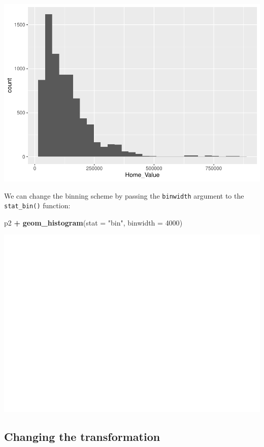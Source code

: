 \documentclass[
]{book}
\newenvironment{Shaded}{\begin{snugshade}}{\end{snugshade}}
\newcommand{\DataTypeTok}[1]{\textcolor[rgb]{0.13,0.29,0.53}{#1}}
\newcommand{\DecValTok}[1]{\textcolor[rgb]{0.00,0.00,0.81}{#1}}
\newcommand{\KeywordTok}[1]{\textcolor[rgb]{0.13,0.29,0.53}{\textbf{#1}}}
\newcommand{\NormalTok}[1]{#1}
\newcommand{\OperatorTok}[1]{\textcolor[rgb]{0.81,0.36,0.00}{\textbf{#1}}}
\newcommand{\StringTok}[1]{\textcolor[rgb]{0.31,0.60,0.02}{#1}}
\begin{document}
\includegraphics{R/Rgraphics/figures/unnamed-chunk-165-1.pdf}

We can change the binning scheme by passing the \texttt{binwidth} argument to the \texttt{stat\_bin()} function:

\begin{Shaded}
\begin{Highlighting}[]
\NormalTok{p2 }\OperatorTok{+}\StringTok{ }\KeywordTok{geom\_histogram}\NormalTok{(}\DataTypeTok{stat =} \StringTok{"bin"}\NormalTok{, }\DataTypeTok{binwidth =} \DecValTok{4000}\NormalTok{)}
\end{Highlighting}
\end{Shaded}

\includegraphics{R/Rgraphics/figures/unnamed-chunk-166-1.pdf}

\hypertarget{changing-the-transformation}{%
\subsection{Changing the transformation}\label{changing-the-transformation}}
\end{document}
